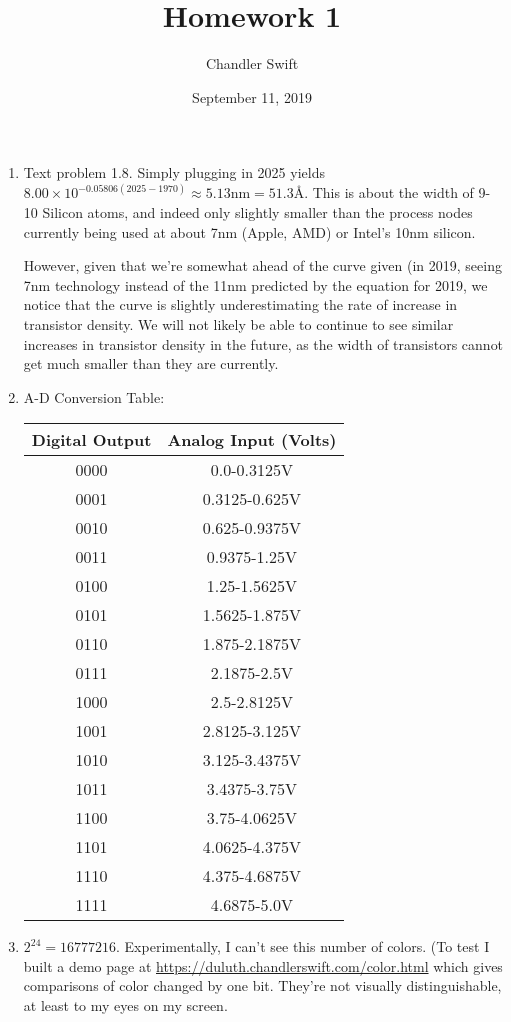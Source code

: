 \documentclass{article}
\title{Homework 1}
\author{Chandler Swift}
\date{September 11, 2019}
\begin{document}
\maketitle
\begin{enumerate}
  \item Text problem 1.8. Simply plugging in 2025 yields $8.00 \times
    10^{-0.05806(2025-1970)} \approx 5.13\text{nm} = 51.3\text{\AA}$. This is
    about the width of 9-10 Silicon atoms, and indeed only slightly smaller
    than the process nodes currently being used at about 7nm (Apple, AMD) or
    Intel's 10nm silicon.

    However, given that we're somewhat ahead of the curve given (in 2019,
    seeing 7nm technology instead of the 11nm predicted by the equation for
    2019, we notice that the curve is slightly underestimating the rate of
    increase in transistor density. We will not likely be able to continue to
    see similar increases in transistor density in the future, as the width
    of transistors cannot get much smaller than they are currently.

  \item A-D Conversion Table:
    \begin{tabular}{ c | c }
      Digital Output & Analog Input (Volts) \\ \hline
      0000 & 0.0-0.3125V \\
      0001 & 0.3125-0.625V \\
      0010 & 0.625-0.9375V \\
      0011 & 0.9375-1.25V \\
      0100 & 1.25-1.5625V \\
      0101 & 1.5625-1.875V \\
      0110 & 1.875-2.1875V \\
      0111 & 2.1875-2.5V \\
      1000 & 2.5-2.8125V \\
      1001 & 2.8125-3.125V \\
      1010 & 3.125-3.4375V \\
      1011 & 3.4375-3.75V \\
      1100 & 3.75-4.0625V \\
      1101 & 4.0625-4.375V \\
      1110 & 4.375-4.6875V \\
      1111 & 4.6875-5.0V \\
    \end{tabular}
  \item $2^{24} = 16777216$. Experimentally, I can't see this number of colors.
    (To test I built a demo page at \url{https://duluth.chandlerswift.com/color.html}
    which gives comparisons of color changed by one bit. They're not visually
    distinguishable, at least to my eyes on my screen.


\end{enumerate}
\end{document}
